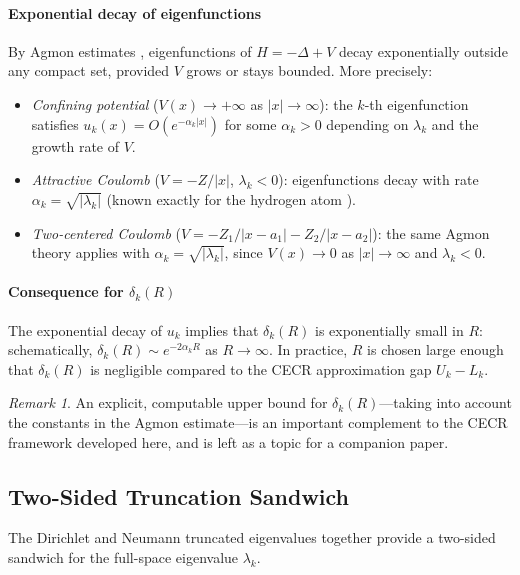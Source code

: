 \documentclass[11pt]{article}
\theoremstyle{plain}
\theoremstyle{definition}
\theoremstyle{remark}
\newtheorem{remark}{Remark}
\begin{document}
\paragraph{Exponential decay of eigenfunctions}
By Agmon estimates \cite{Agmon1982}, eigenfunctions of $H = -\Delta+V$
decay exponentially outside any compact set, provided $V$ grows or
stays bounded.  More precisely:
\begin{itemize}
  \item \emph{Confining potential} ($V(x)\to+\infty$ as $|x|\to\infty$):
    the $k$-th eigenfunction satisfies
    $u_k(x) = O(e^{-\alpha_k|x|})$ for some $\alpha_k > 0$ depending
    on $\lambda_k$ and the growth rate of $V$.
  \item \emph{Attractive Coulomb} ($V = -Z/|x|$, $\lambda_k < 0$):
    eigenfunctions decay with rate $\alpha_k = \sqrt{|\lambda_k|}$
    (known exactly for the hydrogen atom \cite{Reed-Simon}).
  \item \emph{Two-centered Coulomb} ($V = -Z_1/|x-a_1|-Z_2/|x-a_2|$):
    the same Agmon theory applies with $\alpha_k = \sqrt{|\lambda_k|}$,
    since $V(x)\to 0$ as $|x|\to\infty$ and $\lambda_k < 0$.
\end{itemize}

\paragraph{Consequence for \texorpdfstring{$\delta_k(R)$}{delta\_k(R)}}
The exponential decay of $u_k$ implies that $\delta_k(R)$ is
exponentially small in $R$: schematically,
$\delta_k(R) \sim e^{-2\alpha_k R}$ as $R\to\infty$.
In practice, $R$ is chosen large enough that $\delta_k(R)$ is
negligible compared to the CECR approximation gap $U_k - L_k$.

\begin{remark}
An explicit, computable upper bound for $\delta_k(R)$—taking into
account the constants in the Agmon estimate—is an important
complement to the CECR framework developed here, and is left
as a topic for a companion paper.
\end{remark}

\subsection{Two-Sided Truncation Sandwich}
\label{subsec:reduction}

The Dirichlet and Neumann truncated eigenvalues together provide a
two-sided sandwich for the full-space eigenvalue $\lambda_k$.
\end{document}
